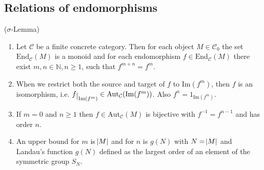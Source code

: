 %
\noindent\begin{minipage}[t]{.55\textwidth}\vspace{0pt}%
\subsection{Relations of endomorphisms}
\begin{lemma}{($\sigma$-Lemma)}
\begin{enumerate}
\renewcommand{\labelenumi}{(\theenumi)}
\item
Let $\mathcal{C}$ be a finite concrete category. Then for each object $M \in \mathcal{C}_{0}$ the set
$\mathrm{End}_{\mathcal{C}}(M)$ is a monoid and for each endomorphism $f \in \mathrm{End}_{\mathcal{C}}(M)$
there exist $m,n \in \mathbb{N}, n\geq 1$, such that $f^{m+n}=f^{m}$.
\item When we restrict both the source and target of $f$ to $\mathrm{Im}(f^{m})$, then $f$ is an isomorphism, i.e.
$f\restrict{\mathrm{Im}(f^{m})} \in \mathrm{Aut}_{\mathcal{C}}(\mathrm{Im}(f^{m}))$. Also $f^{n} = 1_{\mathrm{Im}(f^{m})}$.
\item If $m = 0$ and $n \geq 1$ then $f \in \mathrm{Aut}_{\mathcal{C}}(M)$ is bijective with $f^{-1} = f^{n-1}$ and has order $n$.
\item An upper bound for $m$ is $\abs{M}$ and for $n$ is $g(N)$ with $N = \abs{M}$ and Landau's function $g(N)$
defined as the largest order of an element of the symmetric group $S_{N}$.
\end{enumerate}
\end{lemma}
\vspace{0pt}%
\end{minipage}
%
